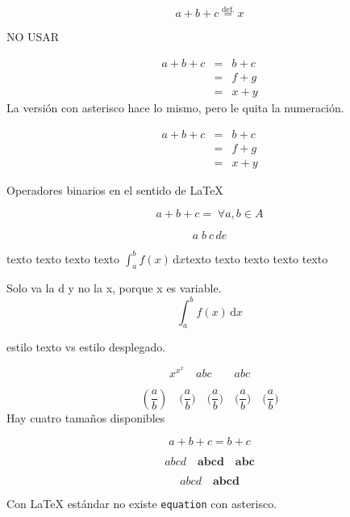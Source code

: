 \documentclass[12pt,a4paper]{report}
\numberwithin{equation}{section}
\begin{document}
$$
a+b+c\stackrel{\mathrm{def.}}{=}x
$$


NO USAR

\begin{eqnarray}%
a + b + c	& = & b + c \\
			& = & f + g \\
			& = & x + y
\end{eqnarray}%
La versión con asterisco hace lo mismo, pero le quita la numeración.

\begin{eqnarray*}%
a + b + c	& = & b + c \\
& = & f + g \\
& = & x + y
\end{eqnarray*}%

Operadores binarios en el sentido de \LaTeX{}

$$
a+b+c=\;\forall a,b\in A
$$

$$
a\; b\: c\,d\!e
$$%

texto texto texto texto $\displaystyle\int_a^b f(x)\,\mathrm{d}x$texto texto texto texto texto

Solo va la d y no la x, porque x es variable.
$$\textstyle\int_a^b f(x)\,\mathrm{d}x$$

estilo texto vs estilo desplegado.

$$
x^{x^x}\quad\scriptscriptstyle{abc}\qquad\scriptstyle{abc}%
$$

$$
(\frac{a}{b})\quad\big(\frac{a}{b}\big)\quad\Big(\frac{a}{b}\Big)\quad\bigg(\frac{a}{b}\bigg)\quad\Bigg(\frac{a}{b}\Bigg)%
$$
Hay cuatro tamaños disponibles

\begin{equation}
a+b+c=b+c
\end{equation}

\newpage

$$
abcd\quad \boldsymbol{abcd}\quad\mathbf{abc}
$$

$$
abcd\quad \pmb{abcd}%
$$

Con \LaTeX{} estándar no existe \texttt{equation} con asterisco.
\end{document}
